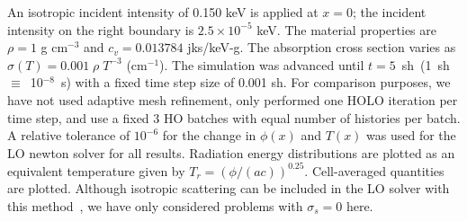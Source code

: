 \begin{table}[H]
\end{table}



   An isotropic incident intensity of 0.150 keV is applied
at $x=0$; the incident intensity on the right boundary is $2.5\times10^{-5}$ keV.
The material properties are $\rho = 1$ g cm$^{-3}$ and $c_v = 0.013784$ jks/keV-g. The
absorption cross section varies as $\sigma(T) = 0.001\;\rho\; T^{-3}$ (cm$^{-1}$).
The simulation was advanced until $t=5$~sh~(1~sh~$\equiv$~10$^{-8}$~s) with a fixed time step size of 0.001 sh. For comparison purposes, we
have not used adaptive mesh
refinement, only performed one HOLO iteration per time
step, and use a fixed 3 HO batches with equal number of histories per batch. A
relative tolerance of $10^{-6}$ for the change in $\phi(x)$ and $T(x)$ was used for
the LO newton solver for all results. Radiation energy
distributions are plotted as an equivalent temperature given by
$T_r=(\phi/(ac))^{0.25}$.  Cell-averaged quantities are plotted.
Although isotropic scattering can be included in the LO solver with this method~\cite{ans_2014}, we have only
considered problems with $\sigma_s = 0$ here.  
